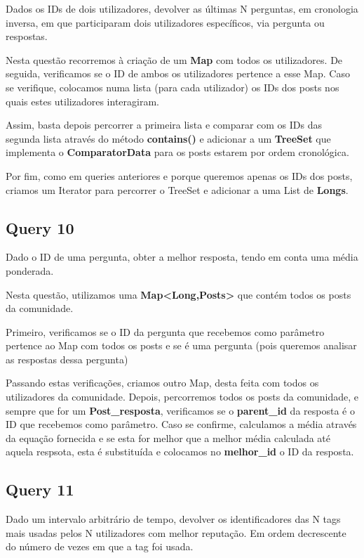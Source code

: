 \documentclass[a4paper]{article}
\begin{document}
Dados os IDs de dois utilizadores, devolver as últimas N perguntas, em
cronologia inversa, em que participaram dois utilizadores específicos, 
via pergunta ou respostas.

Nesta questão recorremos à criação de um \textbf{Map} com todos os utilizadores. De seguida, verificamos se o ID de ambos os utilizadores pertence a esse Map.
Caso se verifique, colocamos numa lista (para cada utilizador) os IDs dos posts nos quais estes utilizadores interagiram.

Assim, basta depois percorrer a primeira lista e comparar com os IDs das segunda lista através do método \textbf{contains()} e adicionar a um \textbf{TreeSet} que implementa o \textbf{ComparatorData} para os posts estarem por ordem cronológica.

Por fim, como em queries anteriores e porque queremos apenas os IDs dos posts, criamos um Iterator para percorrer o TreeSet e adicionar a uma List de \textbf{Longs}.



\subsection{Query 10}


Dado o ID de uma pergunta, obter a melhor resposta, tendo em conta
uma média ponderada.

Nesta questão, utilizamos uma \textbf{Map<Long,Posts>} que contém todos os posts da comunidade.

Primeiro, verificamos se o ID da pergunta que recebemos como parâmetro pertence ao Map com todos os posts e se é uma pergunta (pois queremos analisar as respostas dessa pergunta)

Passando estas verificações, criamos outro Map, desta feita com todos os utilizadores da comunidade. Depois, percorremos todos os posts da comunidade, e sempre que for um \textbf{Post_resposta}, verificamos se o \textbf{parent_id} da resposta é o ID que recebemos como parâmetro. Caso se confirme, calculamos a média através da equação fornecida e se esta for melhor que a melhor média calculada até aquela respsota, esta é substituída e colocamos no \textbf{melhor_id} o ID da resposta.



\subsection{Query 11}


Dado um intervalo arbitrário de tempo, devolver os identificadores das N tags
mais usadas pelos N utilizadores com melhor reputação. Em ordem decrescente 
do número de vezes em que a tag foi usada.
\end{document}
